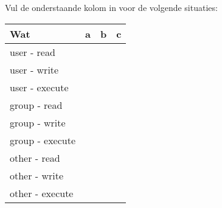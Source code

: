 \question[0] Vul de onderstaande kolom in voor de volgende situaties:
\begin{tabular}[t]{llll}
  Wat & a & b & c\\
  \hline
  user - read & \hspace{2 cm} & \hspace{2 cm} & \hspace{2 cm}\\
  user - write & \hspace{2 cm} & \hspace{2 cm} & \hspace{2 cm}\\
  user - execute & \hspace{2 cm} & \hspace{2 cm} & \hspace{2 cm}\\
  group - read & \hspace{2 cm} & \hspace{2 cm} & \hspace{2 cm}\\
  group - write & \hspace{2 cm} & \hspace{2 cm} & \hspace{2 cm}\\
  group - execute & \hspace{2 cm} & \hspace{2 cm} & \hspace{2 cm}\\
  other - read & \hspace{2 cm} & \hspace{2 cm} & \hspace{2 cm}\\
  other - write & \hspace{2 cm} & \hspace{2 cm} & \hspace{2 cm}\\
  other - execute & \hspace{2 cm} & \hspace{2 cm} & \hspace{2 cm}\\
\end{tabular}

